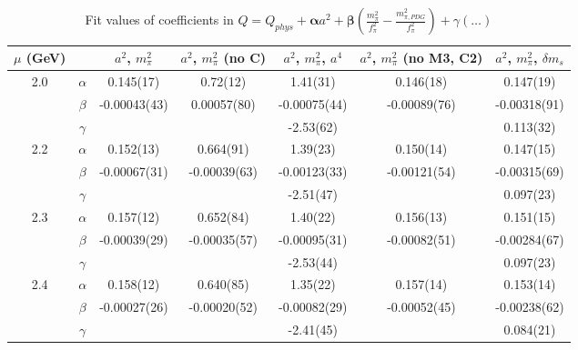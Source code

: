 \documentclass[12pt]{extarticle}
\begin{document}
\begin{table}[h!]
\begin{center}
\begin{tabular}{|c c|c|c|c|c|c|}
\hline
$\mu$ (GeV) &  & $a^2$, $m_\pi^2$& $a^2$, $m_\pi^2$ (no C)& $a^2$, $m_\pi^2$, $a^4$& $a^2$, $m_\pi^2$ (no M3, C2)& $a^2$, $m_\pi^2$, $\delta m_s$\\
\hline
\multirow{3}{0.5in}{2.0} & $\alpha$ & 0.145(17)& 0.72(12)& 1.41(31)& 0.146(18)& 0.147(19)\\
 & $\beta$ & -0.00043(43)& 0.00057(80)& -0.00075(44)& -0.00089(76)& -0.00318(91)\\
 & $\gamma$ &  &  & -2.53(62)&  & 0.113(32)\\
\hline
\multirow{3}{0.5in}{2.2} & $\alpha$ & 0.152(13)& 0.664(91)& 1.39(23)& 0.150(14)& 0.147(15)\\
 & $\beta$ & -0.00067(31)& -0.00039(63)& -0.00123(33)& -0.00121(54)& -0.00315(69)\\
 & $\gamma$ &  &  & -2.51(47)&  & 0.097(23)\\
\hline
\multirow{3}{0.5in}{2.3} & $\alpha$ & 0.157(12)& 0.652(84)& 1.40(22)& 0.156(13)& 0.151(15)\\
 & $\beta$ & -0.00039(29)& -0.00035(57)& -0.00095(31)& -0.00082(51)& -0.00284(67)\\
 & $\gamma$ &  &  & -2.53(44)&  & 0.097(23)\\
\hline
\multirow{3}{0.5in}{2.4} & $\alpha$ & 0.158(12)& 0.640(85)& 1.35(22)& 0.157(14)& 0.153(14)\\
 & $\beta$ & -0.00027(26)& -0.00020(52)& -0.00082(29)& -0.00052(45)& -0.00238(62)\\
 & $\gamma$ &  &  & -2.41(45)&  & 0.084(21)\\
\hline
\end{tabular}
\caption{Fit values of coefficients in $Q = Q_{phys} + \mathbf{\alpha} a^2 + \mathbf{\beta}\left(\frac{m_\pi^2}{f_\pi^2}-\frac{m_{\pi,PDG}^2}{f_\pi^2}\right) + \gamma(\ldots)$}
\end{center}
\end{table}




















\clearpage
\end{document}
